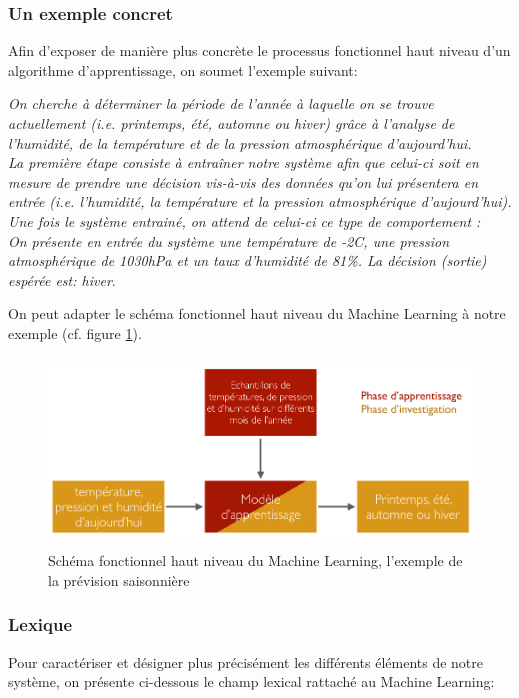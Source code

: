 \subsubsection{Un exemple concret}
\label{Le Machine Learning: Généralités sur le Machine Learning: Définition et principe général:un exemple concret}
Afin d'exposer de manière plus concrète le processus fonctionnel haut niveau d'un algorithme d'apprentissage, on soumet l'exemple suivant:

\textit{On cherche à déterminer la période de l'année à laquelle on se trouve actuellement (i.e. printemps, été, automne ou hiver) grâce à l'analyse de l'humidité, de la température et de la pression atmosphérique d'aujourd'hui. \\
	La première étape consiste à entraîner notre système afin que celui-ci soit en mesure de prendre une décision vis-à-vis des données qu'on lui présentera en entrée (i.e. l'humidité, la température et la pression atmosphérique d'aujourd'hui). \\
	Une fois le système entrainé, on attend de celui-ci ce type de comportement : \\
	On présente en entrée du système une température de -2\degres C, une pression atmosphérique de 1030hPa et un taux d'humidité de 81\%. La décision (sortie) espérée est: \emph{hiver}}.

On peut adapter le schéma fonctionnel haut niveau du Machine Learning à notre exemple (cf. figure \ref{fig:Schéma fonctionnel haut niveau du Machine Learning, l'exemple prévision saisonnière}).

\begin{figure}[h]
	\centering\includegraphics[height=5cm]{images/ML_high_level_expl.png}
	\caption{Schéma fonctionnel haut niveau du Machine Learning, l'exemple de la prévision saisonnière}
	\label{fig:Schéma fonctionnel haut niveau du Machine Learning, l'exemple prévision saisonnière}
\end{figure}

\subsubsection{Lexique} 
\label{Le Machine Learning: Généralités sur le Machine Learning: Définition et principe général:Lexique}
Pour caractériser et  désigner plus précisément les différents éléments de notre système, on présente ci-dessous le champ lexical rattaché au Machine Learning:

